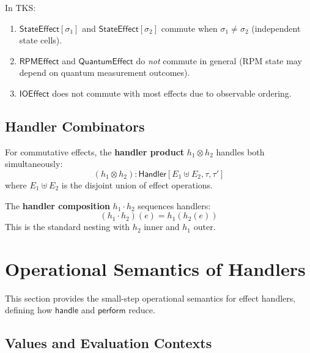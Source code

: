 \begin{proposition}
\label{prop:tks-commutativity}
In TKS:
\begin{enumerate}
  \item $\mathsf{StateEffect}[\sigma_1]$ and $\mathsf{StateEffect}[\sigma_2]$ commute when $\sigma_1 \neq \sigma_2$ (independent state cells).
  \item $\mathsf{RPMEffect}$ and $\mathsf{QuantumEffect}$ do \emph{not} commute in general (RPM state may depend on quantum measurement outcomes).
  \item $\mathsf{IOEffect}$ does not commute with most effects due to observable ordering.
\end{enumerate}
\end{proposition}

\subsection{Handler Combinators}
\label{subsec:handler-combinators}

\begin{definition}
\label{def:handler-product}
For commutative effects, the \textbf{handler product} $h_1 \otimes h_2$ handles both simultaneously:
\[
(h_1 \otimes h_2) : \mathsf{Handler}[E_1 \uplus E_2, \tau, \tau']
\]
where $E_1 \uplus E_2$ is the disjoint union of effect operations.
\end{definition}

\begin{definition}
\label{def:handler-comp}
The \textbf{handler composition} $h_1 \cdot h_2$ sequences handlers:
\[
(h_1 \cdot h_2)(e) = h_1(h_2(e))
\]
This is the standard nesting with $h_2$ inner and $h_1$ outer.
\end{definition}

\section{Operational Semantics of Handlers}
\label{sec:handler-semantics}

This section provides the small-step operational semantics for effect handlers, defining how $\mathsf{handle}$ and $\mathsf{perform}$ reduce.

\subsection{Values and Evaluation Contexts}
\label{subsec:values-contexts}

